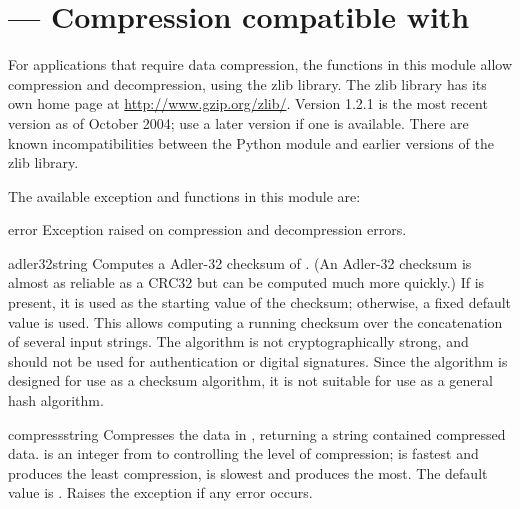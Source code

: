 \section{ ---
         Compression compatible with }



For applications that require data compression, the functions in this
module allow compression and decompression, using the zlib library.
The zlib library has its own home page at
\url{http://www.gzip.org/zlib/}.  Version 1.2.1 is the
most recent version as of October 2004; use a later version if one
is available.  There are known incompatibilities between the Python
module and earlier versions of the zlib library.

The available exception and functions in this module are:

\begin{excdesc}{error}
  Exception raised on compression and decompression errors.
\end{excdesc}


\begin{funcdesc}{adler32}{string}
   Computes a Adler-32 checksum of .  (An Adler-32
   checksum is almost as reliable as a CRC32 but can be computed much
   more quickly.)  If  is present, it is used as the
   starting value of the checksum; otherwise, a fixed default value is
   used.  This allows computing a running checksum over the
   concatenation of several input strings.  The algorithm is not
   cryptographically strong, and should not be used for
   authentication or digital signatures.  Since the algorithm is
   designed for use as a checksum algorithm, it is not suitable for
   use as a general hash algorithm.
\end{funcdesc}

\begin{funcdesc}{compress}{string}
  Compresses the data in , returning a string contained
  compressed data.   is an integer from  to
   controlling the level of compression;  is fastest
  and produces the least compression,  is slowest and produces
  the most.  The default value is .  Raises the
   exception if any error occurs.
\end{funcdesc}

